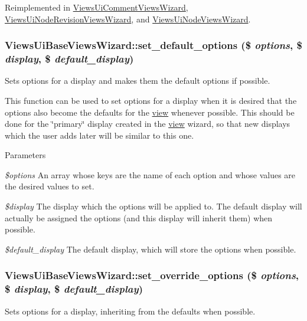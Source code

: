 Reimplemented in \hyperlink{classViewsUiCommentViewsWizard_a7cf128d60641d6b2e7125b98c4a7dc14}{ViewsUiCommentViewsWizard}, \hyperlink{classViewsUiNodeRevisionViewsWizard_a920d30184506f8f5a9c8db643742b329}{ViewsUiNodeRevisionViewsWizard}, and \hyperlink{classViewsUiNodeViewsWizard_acc49f93c07b0fdcacccc4c7d6d62d9ed}{ViewsUiNodeViewsWizard}.\hypertarget{classViewsUiBaseViewsWizard_acbcdfdd0fd778fc37844d80348b4fe5f}{
\subsubsection[{set\_\-default\_\-options}]{\setlength{\rightskip}{0pt plus 5cm}ViewsUiBaseViewsWizard::set\_\-default\_\-options (\$ {\em options}, \/  \$ {\em display}, \/  \$ {\em default\_\-display})}}
\label{classViewsUiBaseViewsWizard_acbcdfdd0fd778fc37844d80348b4fe5f}
Sets options for a display and makes them the default options if possible.

This function can be used to set options for a display when it is desired that the options also become the defaults for the \hyperlink{classview}{view} whenever possible. This should be done for the \char`\"{}primary\char`\"{} display created in the \hyperlink{classview}{view} wizard, so that new displays which the user adds later will be similar to this one.


\begin{DoxyParams}{Parameters}
\item[{\em \$options}]An array whose keys are the name of each option and whose values are the desired values to set. \item[{\em \$display}]The display which the options will be applied to. The default display will actually be assigned the options (and this display will inherit them) when possible. \item[{\em \$default\_\-display}]The default display, which will store the options when possible. \end{DoxyParams}
\hypertarget{classViewsUiBaseViewsWizard_a480c82e9b10a7197b37845e18dc9748f}{
\subsubsection[{set\_\-override\_\-options}]{\setlength{\rightskip}{0pt plus 5cm}ViewsUiBaseViewsWizard::set\_\-override\_\-options (\$ {\em options}, \/  \$ {\em display}, \/  \$ {\em default\_\-display})}}
\label{classViewsUiBaseViewsWizard_a480c82e9b10a7197b37845e18dc9748f}
Sets options for a display, inheriting from the defaults when possible.

